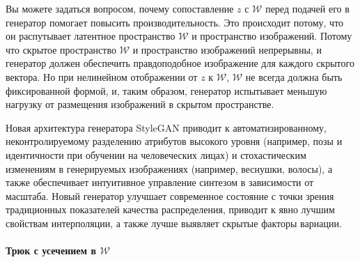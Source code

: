 Вы можете задаться вопросом, почему сопоставление $z$ с $\mathcal{W}$ перед подачей его в генератор помогает повысить производительность. Это происходит потому, что он распутывает латентное пространство $\mathcal{W}$ и пространство изображений. Потому что скрытое пространство $\mathcal{W}$ и пространство изображений непрерывны, и генератор должен обеспечить правдоподобное изображение для каждого скрытого вектора. Но при нелинейном отображении от $z$ к $\mathcal{W}$, $\mathcal{W}$ не всегда должна быть фиксированной формой, и, таким образом, генератор испытывает меньшую нагрузку от размещения изображений в скрытом пространстве.

Новая архитектура генератора StyleGAN приводит к автоматизированному, неконтролируемому разделению атрибутов высокого уровня (например, позы и идентичности при обучении на человеческих лицах) и стохастическим изменениям в генерируемых изображениях (например, веснушки, волосы), а также обеспечивает интуитивное управление синтезом в зависимости от масштаба. Новый генератор улучшает современное состояние с точки зрения традиционных показателей качества распределения, приводит к явно лучшим свойствам интерполяции, а также лучше выявляет скрытые факторы вариации\cite{StyleGAN}.

\paragraph{Трюк с усечением в $\mathcal{W}$}


